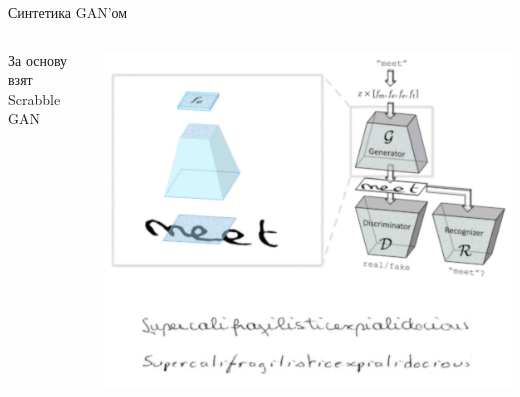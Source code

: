 \documentclass[fleqn, xcolor=x11names]{beamer}
\begin{document}
\begin{frame}{Синтетика GAN'ом}

    \begin{columns}
        \begin{column}{0.4\textwidth}
            За основу взят Scrabble GAN \cite{scrabble_gan}
        \end{column}
        \begin{column}{0.6\textwidth}  %
            \centering
            \includegraphics[width=\linewidth]{scrabble_gan.png}
        \end{column}
    \end{columns}
    
\end{frame}

\end{document}
